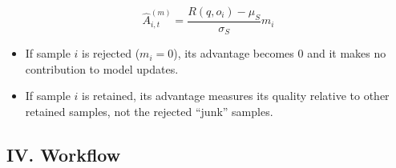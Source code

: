 \[
\hat{A}_{i,t}^{(m)} = \frac{R(q,o_i)-\mu_S}{\sigma_S} m_i
\]

\begin{itemize}
\tightlist
\item
  If sample \(i\) is rejected (\(m_i=0\)), its advantage becomes \(0\) and it makes no contribution to model updates.
\item
  If sample \(i\) is retained, its advantage measures its quality relative to other retained samples, not the rejected ``junk'' samples.
\end{itemize}

\hypertarget{iv.-workflow}{%
\subsection{IV. Workflow}\label{iv.-workflow}}

